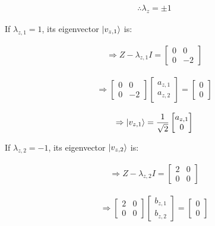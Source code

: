 \begin{align}
  \label{eq:2.11.23}
  \therefore \lambda_z=\pm 1
\end{align}

If $\lambda_{z,1}=1$, its eigenvector $\ket{v_{z,1}}$ is:

\begin{align}
  \label{eq:2.11.24}
  \Rightarrow Z-\lambda_{z,1} I
  =
  \begin{bmatrix}
    0 & 0 \\
    0 & -2
  \end{bmatrix} 
\end{align}

\begin{align}
  \label{eq:2.11.25}
  \Rightarrow
  \begin{bmatrix}
    0 & 0 \\
    0 & -2
  \end{bmatrix}
  \begin{bmatrix}
    a_{z,1} \\
    a_{z,2}
  \end{bmatrix}
  =
  \begin{bmatrix}
    0 \\
    0
  \end{bmatrix}
\end{align}

\begin{align}
  \label{eq:2.11.26}
  \Rightarrow \ket{v_{z,1}} = \frac{1}{\sqrt{2}}
  \begin{bmatrix}
    a_{z,1} \\
    0
  \end{bmatrix} 
\end{align}

If $\lambda_{z,2}=-1$, its eigenvector $\ket{v_{z,2}}$ is:

\begin{align}
  \label{eq:2.11.27}
  \Rightarrow Z-\lambda_{z,2} I
  =
  \begin{bmatrix}
    2 & 0 \\
    0 & 0
  \end{bmatrix} 
\end{align}

\begin{align}
  \label{eq:2.11.28}
  \Rightarrow
  \begin{bmatrix}
    2 & 0 \\
    0 & 0
  \end{bmatrix}
  \begin{bmatrix}
    b_{z,1} \\
    b_{z,2}
  \end{bmatrix}
  =
  \begin{bmatrix}
    0 \\
    0
  \end{bmatrix}
\end{align}

